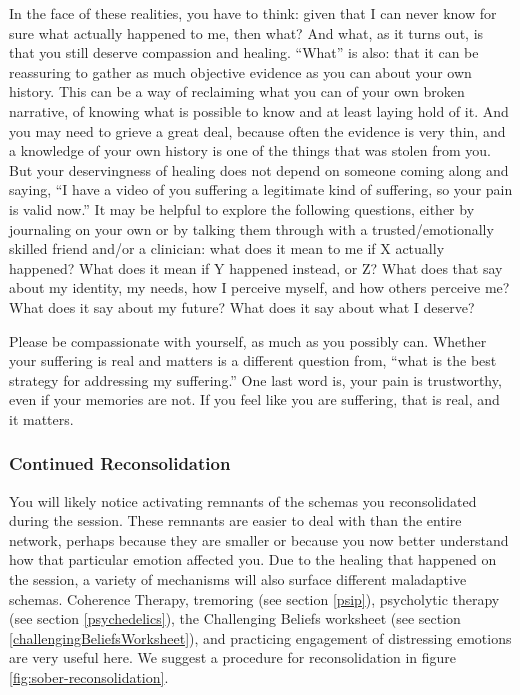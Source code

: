 \documentclass[12pt,letterpaper]{article}
\begin{document}
In the face of these realities, you have to think: given that I can never know for sure what actually happened to me, then what?  And what, as it turns out, is that you still deserve compassion and healing.  “What” is also: that it can be reassuring to gather as much objective evidence as you can about your own history. This can be a way of reclaiming what you can of your own broken narrative, of knowing what is possible to know and at least laying hold of it. And you may need to grieve a great deal, because often the evidence is very thin, and a knowledge of your own history is one of the things that was stolen from you. But your deservingness of healing does not depend on someone coming along and saying, “I have a video of you suffering a legitimate kind of suffering, so your pain is valid now.” It may be helpful to explore the following questions, either by journaling on your own or by talking them through with a trusted/emotionally skilled friend and/or a clinician: what does it mean to me if X actually happened? What does it mean if Y happened instead, or Z? What does that say about my identity, my needs, how I perceive myself, and how others perceive me? What does it say about my future? What does it say about what I deserve?

Please be compassionate with yourself, as much as you possibly can. Whether your suffering is real and matters is a different question from, “what is the best strategy for addressing my suffering.” One last word is, your pain is trustworthy, even if your memories are not. If you feel like you are suffering, that is real, and it matters.
\subsubsection{Continued Reconsolidation}
You will likely notice activating remnants of the schemas you reconsolidated during the session. These remnants are easier to deal with than the entire network, perhaps because they are smaller or because you now better understand how that particular emotion affected you. Due to the healing that happened on the session, a variety of mechanisms will also surface different maladaptive schemas. Coherence Therapy, tremoring (see section \ref{psip}), psycholytic therapy (see section \ref{psychedelics}), the Challenging Beliefs worksheet (see section \ref{challengingBeliefsWorksheet}), and practicing engagement of distressing emotions are very useful here. We suggest a procedure for reconsolidation in figure \ref{fig:sober-reconsolidation}.
\end{document}
